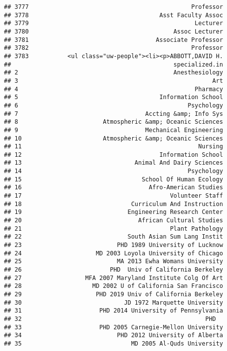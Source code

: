 \documentclass[
]{article}
\begin{document}
\begin{verbatim}
## 3777                                              Professor
## 3778                                     Asst Faculty Assoc
## 3779                                               Lecturer
## 3780                                         Assoc Lecturer
## 3781                                    Associate Professor
## 3782                                              Professor
## 3783           <ul class="uw-people"><li><p>ABBOTT,DAVID H.
##                                              specialized.in
## 2                                            Anesthesiology
## 3                                                       Art
## 4                                                  Pharmacy
## 5                                        Information School
## 6                                                Psychology
## 7                                    Accting &amp; Info Sys
## 8                        Atmospheric &amp; Oceanic Sciences
## 9                                    Mechanical Engineering
## 10                       Atmospheric &amp; Oceanic Sciences
## 11                                                  Nursing
## 12                                       Information School
## 13                                Animal And Dairy Sciences
## 14                                               Psychology
## 15                                  School Of Human Ecology
## 16                                    Afro-American Studies
## 17                                          Volunteer Staff
## 18                               Curriculum And Instruction
## 19                              Engineering Research Center
## 20                                 African Cultural Studies
## 21                                          Plant Pathology
## 22                              South Asian Sum Lang Instit
## 23                           PHD 1989 University of Lucknow
## 24                     MD 2003 Loyola University of Chicago
## 25                           MA 2013 Ewha Womans University
## 26                         PHD  Univ of California Berkeley
## 27                  MFA 2007 Maryland Institute Colg Of Art
## 28                    MD 2002 U of California San Francisco
## 29                     PHD 2019 Univ of California Berkeley
## 30                             JD 1972 Marquette University
## 31                      PHD 2014 University of Pennsylvania
## 32                                                    PHD  
## 33                      PHD 2005 Carnegie-Mellon University
## 34                           PHD 2012 University of Alberta
## 35                               MD 2005 Al-Quds University

\end{verbatim}
\end{document}
